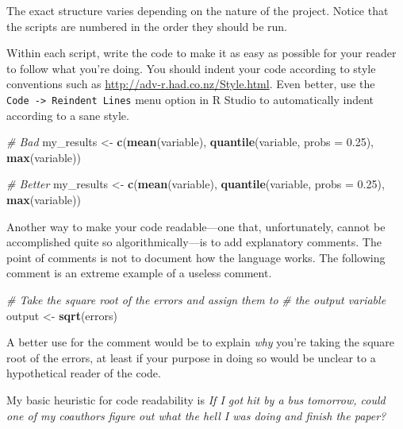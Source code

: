 \documentclass[12pt,oneside,openany]{book}
\newenvironment{Shaded}{\begin{snugshade}}{\end{snugshade}}
\newcommand{\KeywordTok}[1]{\textcolor[rgb]{0.13,0.29,0.53}{\textbf{#1}}}
\newcommand{\DataTypeTok}[1]{\textcolor[rgb]{0.13,0.29,0.53}{#1}}
\newcommand{\FloatTok}[1]{\textcolor[rgb]{0.00,0.00,0.81}{#1}}
\newcommand{\StringTok}[1]{\textcolor[rgb]{0.31,0.60,0.02}{#1}}
\newcommand{\CommentTok}[1]{\textcolor[rgb]{0.56,0.35,0.01}{\textit{#1}}}
\newcommand{\NormalTok}[1]{#1}
\begin{document}
The exact structure varies depending on the nature of the project.
Notice that the scripts are numbered in the order they should be run.

Within each script, write the code to make it as easy as possible for
your reader to follow what you're doing. You should indent your code
according to style conventions such as
\url{http://adv-r.had.co.nz/Style.html}. Even better, use the
\texttt{Code\ -\textgreater{}\ Reindent\ Lines} menu option in R Studio
to automatically indent according to a sane style.

\begin{Shaded}
\begin{Highlighting}[]
\CommentTok{# Bad}
\NormalTok{my_results <-}\StringTok{ }\KeywordTok{c}\NormalTok{(}\KeywordTok{mean}\NormalTok{(variable),}
\KeywordTok{quantile}\NormalTok{(variable,}
\DataTypeTok{probs =} \FloatTok{0.25}\NormalTok{),}
\KeywordTok{max}\NormalTok{(variable))}

\CommentTok{# Better}
\NormalTok{my_results <-}\StringTok{ }\KeywordTok{c}\NormalTok{(}\KeywordTok{mean}\NormalTok{(variable),}
                \KeywordTok{quantile}\NormalTok{(variable,}
                         \DataTypeTok{probs =} \FloatTok{0.25}\NormalTok{),}
                \KeywordTok{max}\NormalTok{(variable))}
\end{Highlighting}
\end{Shaded}

Another way to make your code readable---one that, unfortunately, cannot
be accomplished quite so algorithmically---is to add explanatory
comments. The point of comments is not to document how the language
works. The following comment is an extreme example of a useless comment.

\begin{Shaded}
\begin{Highlighting}[]
\CommentTok{# Take the square root of the errors and assign them to}
\CommentTok{# the output variable}
\NormalTok{output <-}\StringTok{ }\KeywordTok{sqrt}\NormalTok{(errors)}
\end{Highlighting}
\end{Shaded}

A better use for the comment would be to explain \emph{why} you're
taking the square root of the errors, at least if your purpose in doing
so would be unclear to a hypothetical reader of the code.

My basic heuristic for code readability is \emph{If I got hit by a bus
tomorrow, could one of my coauthors figure out what the hell I was doing
and finish the paper?}
\end{document}

